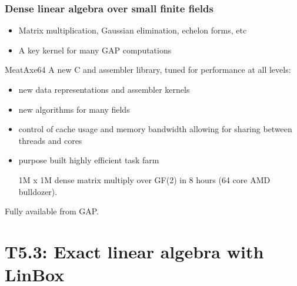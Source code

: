 \documentclass{beamer}
\newcommand{\thus}{\textcolor{red}{\MVRightarrow{}}\xspace}
\begin{document}
\begin{frame}
  \frametitle{Dense linear algebra over small finite fields}

  \begin{itemize}
  \item Matrix multiplication, Gaussian elimination, echelon forms, etc
  \item A key kernel for many GAP computations
  \end{itemize}

  \begin{block}{MeatAxe64}
  A new C and assembler library, tuned for performance at all levels:

  \begin{itemize}
  \item new data representations and assembler kernels
  \item new algorithms for many fields
  \item control of cache usage and memory bandwidth
    \thus allowing for sharing between threads and cores
  \item  purpose built highly efficient task farm

    \thus 1M x 1M dense matrix multiply over GF(2) in 8 hours (64 core AMD bulldozer).

  \end{itemize}
    Fully available from GAP.
  \end{block}

\end{frame}
\section{T5.3: Exact linear algebra with LinBox}
\end{document}
